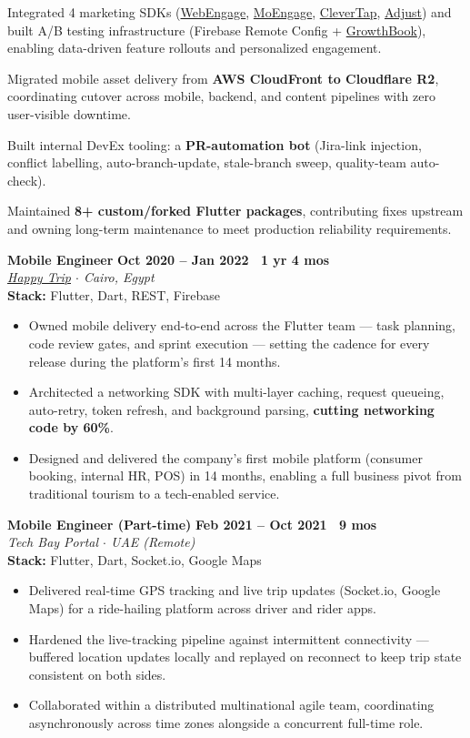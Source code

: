 \documentclass[10pt,a4paper]{article}
\newcommand{\workexp}[5]{
    \noindent \textbf{#1} \hfill \textbf{#2} \\
    \textit{#3} \\
    {\small\color{techstack}\textbf{Stack:} #4}
    \vspace{0pt}
    \begin{itemize}[itemsep=2.4pt,parsep=0pt,topsep=2pt,leftmargin=1.5em]
    #5
    \end{itemize}
    \vspace{3pt}
}
\begin{document}
{    \item Integrated 4 marketing SDKs (\href{https://webengage.com/}{WebEngage}, \href{https://www.moengage.com/}{MoEngage}, \href{https://clevertap.com/}{CleverTap}, \href{https://www.adjust.com/}{Adjust}) and built A/B testing infrastructure (Firebase Remote Config + \href{https://www.growthbook.io/}{GrowthBook}), enabling data-driven feature rollouts and personalized engagement.
    \item Migrated mobile asset delivery from \textbf{AWS CloudFront to Cloudflare R2}, coordinating cutover across mobile, backend, and content pipelines with zero user-visible downtime.
    \item Built internal DevEx tooling: a \textbf{PR-automation bot} (Jira-link injection, conflict labelling, auto-branch-update, stale-branch sweep, quality-team auto-check).
    \item Maintained \textbf{8+ custom/forked Flutter packages}, contributing fixes upstream and owning long-term maintenance to meet production reliability requirements.
    }

    \workexp{Mobile Engineer}{Oct 2020 -- Jan 2022 \textbullet\ 1 yr 4 mos}
    {\href{https://www.linkedin.com/company/happytrip-ar}{Happy Trip} $\cdot$ Cairo, Egypt}
    {Flutter, Dart, REST, Firebase}
    {
        \item Owned mobile delivery end-to-end across the Flutter team --- task planning, code review gates, and sprint execution --- setting the cadence for every release during the platform's first 14 months.
    \item Architected a networking SDK with multi-layer caching, request queueing, auto-retry, token refresh, and background parsing, \textbf{cutting networking code by 60\%}.
    \item Designed and delivered the company's first mobile platform (consumer booking, internal HR, POS) in 14 months, enabling a full business pivot from traditional tourism to a tech-enabled service.
    }

    \workexp{Mobile Engineer (Part-time)}{Feb 2021 -- Oct 2021 \textbullet\ 9 mos}
    {Tech Bay Portal $\cdot$ UAE (Remote)}
    {Flutter, Dart, Socket.io, Google Maps}
    {
        \item Delivered real-time GPS tracking and live trip updates (Socket.io, Google Maps) for a ride-hailing platform across driver and rider apps.
    \item Hardened the live-tracking pipeline against intermittent connectivity --- buffered location updates locally and replayed on reconnect to keep trip state consistent on both sides.
    \item Collaborated within a distributed multinational agile team, coordinating asynchronously across time zones alongside a concurrent full-time role.
    }
\end{document}
